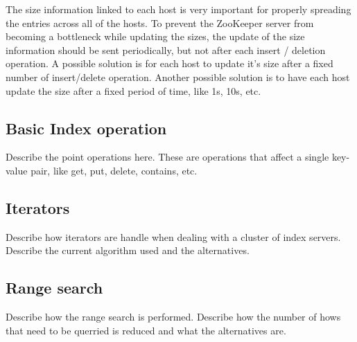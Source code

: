 \documentclass[11pt,a4paper]{globis-book}
\begin{document}
The size information linked to each host is very important for properly spreading the entries across all of the hosts. To prevent the ZooKeeper server from becoming a bottleneck while updating the sizes, the update of the size information should be sent periodically, but not after each insert / deletion operation. A possible solution is for each host to update it's size after a fixed number of insert/delete operation. Another possible solution is to have each host update the size after a fixed period of time, like 1s, 10s, etc. 
\subsection{Basic Index operation}

Describe the point operations here. These are operations that affect a single key-value pair, like get, put, delete, contains, etc.

\subsection{Iterators}
Describe how iterators are handle when dealing with a cluster of index servers. Describe the current algorithm used and the alternatives.

\subsection{Range search}
Describe how the range search is performed. Describe how the number of hows that need to be querried is reduced and what the alternatives are.
\end{document}
